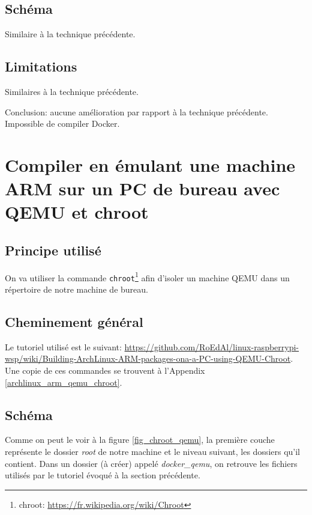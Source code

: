 \documentclass[11pt,a4paper,oneside]{report}
\newcommand{\code}[1]{\texttt{#1}} %
\begin{document}
\subsection{Schéma}

Similaire à la technique précédente.

\subsection{Limitations}

Similaires à la technique précédente.

Conclusion: aucune amélioration par rapport à la technique précédente. Impossible de compiler Docker.



\section{Compiler en émulant une machine ARM sur un PC de bureau avec QEMU et chroot}

\subsection{Principe utilisé}

On va utiliser la commande \code{chroot}\footnote{chroot: \url{https://fr.wikipedia.org/wiki/Chroot}} afin d'isoler un machine QEMU dans un répertoire de notre machine de bureau.

\subsection{Cheminement général}

Le tutoriel utilisé est le suivant: \url{https://github.com/RoEdAl/linux-raspberrypi-wsp/wiki/Building-ArchLinux-ARM-packages-ona-a-PC-using-QEMU-Chroot}. Une copie de ces commandes se trouvent à l'Appendix \ref{archlinux_arm_qemu_chroot}.

\subsection{Schéma}

Comme on peut le voir à la figure \ref{fig_chroot_qemu}, la première couche représente le dossier \textit{root} de notre machine et le niveau suivant, les dossiers qu'il contient. Dans un dossier (à créer) appelé \textit{docker\_qemu}, on retrouve les fichiers utilisés par le tutoriel évoqué à la section précédente.
\end{document}
